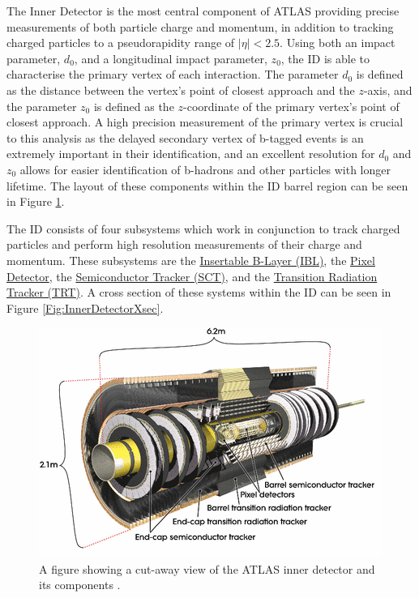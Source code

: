 \documentclass[12pt,a4paper,epsf,portrait,times,epsfig]{report}
\begin{document}
		The Inner Detector \cite{ATLASID1, ATLASID2} is the most central component of ATLAS providing precise measurements of both particle charge and momentum, in addition to tracking charged particles to a pseudorapidity range of $|\eta| < 2.5$. Using both an impact parameter, $d_{0}$, and a longitudinal impact parameter, $z_{0}$, the ID is able to characterise the primary vertex of each interaction. The parameter $d_{0}$ is defined as the distance between the vertex's point of closest approach and the $z$-axis, and the parameter $z_{0}$ is defined as the $z$-coordinate of the primary vertex's point of closest approach. A high precision measurement of the primary vertex is crucial to this analysis as the delayed secondary vertex of b-tagged events is an extremely important in their identification, and an excellent resolution for $d_{0}$ and $z_{0}$ allows for easier identification of b-hadrons and other particles with longer lifetime. The layout of these components within the ID barrel region can be seen in Figure \ref{Fig:InnerDetector}.  

		The ID consists of four subsystems which work in conjunction to track charged particles and perform high resolution measurements of their charge and momentum. These subsystems are the \hyperref[Section:IBL]{Insertable B-Layer (IBL)}, the \hyperref[Section:PixelDetector]{Pixel Detector}, the \hyperref[Section:SCT]{Semiconductor Tracker (SCT)}, and the \hyperref[Section:TRT]{Transition Radiation Tracker (TRT)}. A cross section of these systems within the ID can be seen in Figure \ref{Fig:InnerDetectorXsec}.

		\begin{figure}
			\centering
			\includegraphics[scale=0.7]{Inner_Detector}
			\caption{A figure showing a cut-away view of the ATLAS inner detector and its components \cite{ATLASIDImage}. }
			\label{Fig:InnerDetector}
		\end{figure}
\end{document}
